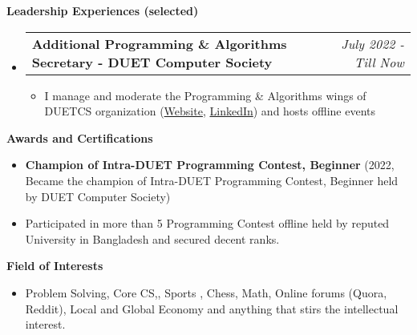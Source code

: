 \documentclass[legalpaper,10pt]{article}
\makeatletter
\newcommand{\resheading}[1]{{\large \colorbox{mygrey}{\begin{minipage}{\textwidth}{\textbf{#1 \vphantom{p\^{E}}}}\end{minipage}}}}
\newcommand{\ressubheading}[4]{
	\begin{tabular*}{7.1in}{l@{\extracolsep{\fill}}r}
		\textbf{#1} & \textit{#4} \\
	\end{tabular*}\vspace{-6pt}}
\makeatother
\begin{document}
	\vspace{0.20in}
	
	\resheading{Leadership Experiences (selected)}
	\begin{itemize}
		\item \ressubheading{Additional Programming \& Algorithms Secretary - DUET Computer Society}{}{}{July 2022 - Till Now}
		\begin{itemize}
		    \item I manage and moderate the Programming \& Algorithms wings of DUETCS organization (\href{https://duetcs.github.io}{Website}, \href{https://www.linkedin.com/company/duet-computer-society}{LinkedIn}) and hosts offline events
		\end{itemize}
		
	\end{itemize}

	\vspace{0.20in}
	
	\resheading{Awards and Certifications}
	\begin{itemize}
		
		\item \textbf{Champion of Intra-DUET Programming Contest, Beginner} (2022, Became the champion of Intra-DUET Programming Contest, Beginner held by DUET Computer Society)

      \item Participated in more than 5 Programming Contest offline held by reputed University in Bangladesh and secured decent ranks.

	\end{itemize}

	\vspace{0.20in}
	
	\resheading{Field of Interests}
		\begin{itemize}
			\item Problem Solving, Core CS,, Sports , Chess, Math, Online forums (Quora, Reddit), Local and Global Economy and anything that stirs the intellectual interest.
		\end{itemize}
\end{document}
